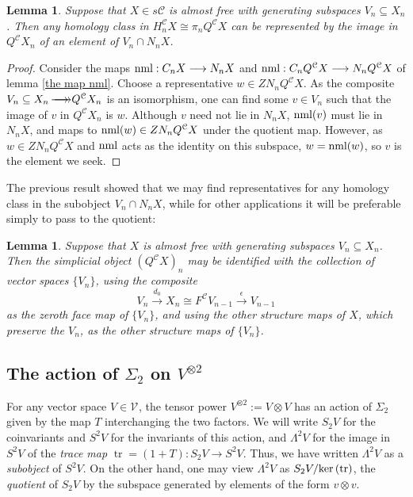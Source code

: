 \documentclass[11pt]{amsart}
\theoremstyle{plain}
\newtheorem{lem}[thm]{Lemma}
\theoremstyle{definition}
\renewcommand{\ker}{\textup{ker}\,}
\DeclareMathOperator{\trace}{tr}
\renewcommand{\to}{\longrightarrow}
\newcommand{\calV}{\mathcal{V}}
\newcommand{\calc}{\mathcal{C}}
\theoremstyle{plain}
\newcommand{\vect}[2]{\calV^{#1}_{#2}}
\newcommand{\epi}{{\,\makebox[0cm][l]{\ensuremath\to}\to}}
\begin{document}
\begin{Conventions and notation}
\begin{lem}\label{lemma on homology class repd by normalized generator}
Suppose that $X\in s\calc$ is almost free with generating subspaces $V_n\subseteq X_n$. Then any homology class in $H_n^{\calc}X\cong \pi_nQ^{\calc}X$ can be represented by the image in $Q^{\calc}X_n$ of an element of $V_n\cap N_nX$.
\end{lem}
\begin{proof}
Consider the maps $\textup{nml}:C_nX\to N_nX$ and $\textup{nml}:C_nQ^\calc X\to N_nQ^\calc X$ of lemma \ref{the map nml}.
Choose a representative $w\in ZN_nQ^\calc X$. As the composite $V_n\subseteq X_n\epi Q^\calc X_n$ is an isomorphism, one can find some $v\in V_n$ such that the image of $v$ in $Q^\calc X_n$ is $w$. Although $v$ need not lie in $N_nX$, $\textup{nml}(v)$ must lie in $N_nX$, and maps to $\textup{nml}(w)\in ZN_nQ^\calc X$ under the quotient map.  However, as $w\in ZN_nQ^\calc X$ and $\textup{nml}$ acts as the identity on this subspace, $w=\textup{nml}(w)$, so $v$ is the element we seek.
\end{proof}
The previous result showed that we may find representatives for any homology class in the subobject $V_n\cap N_nX$, while for other applications it will be preferable simply to pass to the quotient: %
\begin{lem}\label{identify almost free indecs with gens}
Suppose that $X$ is almost free with generating subspaces $V_n\subseteq X_n$. Then the simplicial object $(Q^{\calc}X)_{n}$ may be identified with the collection of vector spaces $\{V_n\}$, using  the composite
\[V_{n}\overset{d_0}{\to}X_n\cong F^{\calc}V_{n-1}\overset{\epsilon}{\to}V_{n-1}\]
as the zeroth face map of $\{V_n\}$, and using the other structure maps of $X$, which preserve the $V_{n}$, as the other structure maps of $\{V_n\}$.
\end{lem}



\subsection{The action of $\Sigma_2$ on $V^{\otimes 2}$}
For any vector space $V\in \vect{}{}$, the tensor power $V^{\otimes2}:=V\otimes V$ has an action of $\Sigma_2$ given by the map $T$ interchanging the two factors. We will write $S_2V$ for the coinvariants and $S^2V$ for the invariants of this action, and $\Lambda^2V$ for the image in $S^2V$ of the \emph{trace map} $\trace=(1+T):S_2V\to S^2V$. Thus, we have written $\Lambda^2V$ as a \emph{subobject} of $S^2V$.
On the other hand, one may view $\Lambda^2V$ as $S_2V/\ker(\trace)$,  the \emph{quotient} of $S_2V$ by the subspace generated by elements of the form $v\otimes v$. %


\end{Conventions and notation}
\end{document}
